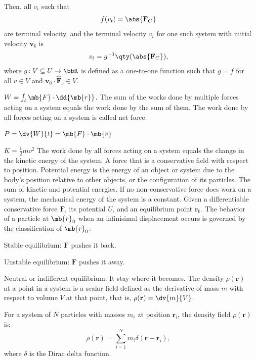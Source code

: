 \documentclass[a4paper,12pt]{article}
\begin{document}
Then, all $v_t$ such that
\[f(v_t)=\abs{\mathbf{F}_C}\]
are terminal velocity, and the terminal velocity $v_t$ for one such system with initial velocity $\mathbf{v}_0$ is
\[v_t=g^{-1}\qty(\abs{\mathbf{F}_C}),\]
where $g\colon V\subseteq U\to\bbR$ is defined as a one-to-one function such that $g=f$ for all $v\in V$ and $\mathbf{v}_0\cdot\hat{\mathbf{F}}_c\in V$.
\bit
\item{} $W=\int_{\ell}\mb{F}\cdot\dd{\mb{r}}$. The sum of the works done by multiple forces acting on a system equals the work done by the sum of them. The work done by all forces acting on a system is called net force.
\item{} $P=\dv{W}{t}=\mb{F}\cdot\mb{v}$
\item{} $K=\frac{1}{2}mv^2$
\eit
{}
The work done by all forces acting on a system equals the change in the kinetic energy of the system.
A force that is a conservative field with respect to position.
Potential energy is the energy of an object or system due to the body's position relative to other objects, or the configuration of its particles.
The sum of kinetic and potential energies.
If no non-conservative force does work on  a system, the mechanical energy of the system is a constant.
Given a differentiable conservative force $\mathbf{F}$, its potential $U$, and an equilibrium point $\mathbf{r}_0$. The behavior of a particle at $\mb{r}_0$ when an infinisimal displacement occurs is governed by the classification of $\mb{r}_0$:
\bit
\item Stable equilibrium: $\mathbf{F}$ pushes it back.
\item Unstable equilibrium: $\mathbf{F}$ pushes it away.
\item Neutral or indifferent equilibrium: It stay where it becomes.
\eit
{}
The density $\rho(\mathbf{r})$ at a point in a system is a scalar field defined as the derivative of mass $m$ with respect to volume $V$ at that point, that is, $\rho(\mathbf{r})=\dv{m}{V}$.

For a system of $N$ particles with masses $m_i$ at position $\mathbf{r}_i$, the density field $\rho(\mathbf{r})$ is:
\[\rho(\mathbf{r})=\sum_{i=1}^Nm_i\delta(\mathbf{r}-\mathbf{r}_i),\]
where $\delta$ is the Dirac delta function.
\end{document}
